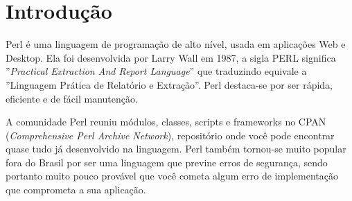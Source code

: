 \chapter{Introdu\c{c}\~ao}

Perl \'e uma linguagem de programa\c{c}\~ao de alto n\'ivel, usada em aplica\c{c}\~oes Web e Desktop. Ela foi desenvolvida por Larry Wall
em 1987, a sigla PERL significa ''\textit{Practical Extraction And Report Language}'' que traduzindo equivale a ''Linguagem Pr\'atica de Relat\'orio e 
Extra\c{c}\~ao''. Perl destaca-se por ser r\'apida, eficiente e de f\'acil manuten\c{c}\~ao. 

A comunidade Perl reuniu m\'odulos, classes, scripts e frameworks no CPAN (\textit{Comprehensive Perl Archive   Network}), reposit\'orio onde voc\^e pode 
encontrar quase tudo j\'a desenvolvido na linguagem. Perl também tornou-se muito popular fora do Brasil por ser uma linguagem que previne erros de 
seguran\c{c}a, sendo portanto muito pouco prov\'avel que voc\^e cometa algum erro de implementa\c{c}\~ao que comprometa a sua aplica\c{c}\~ao. 



